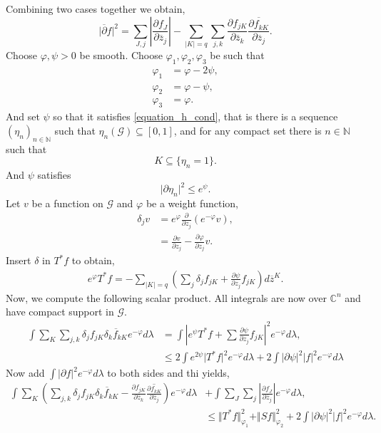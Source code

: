 \documentclass{article}
\newcommand{\norm}[1]{\Vert #1 \Vert}
\newcommand{\N}[0]{\mathbb{N}}
\newcommand{\C}[0]{\mathbb{C}}
\newcommand{\G}[0]{\mathcal{G}}
\newcommand{\pd}[2]{{\frac {\partial#1} {\partial#2}}}
\begin{document}
Combining two cases together we obtain,
\begin{equation*}
  \vert \overline{\partial}f\vert^2 = \sum_{J,j}\left\vert\pd{f_J}{\overline{z}_j}\right\vert-\sum_{\vert K\vert =q}\sum_{j,k}\pd{f_{jK}}{\overline{z}_k}\overline{\pd{f_{kK}}{\overline{z}_j}}.
\end{equation*}
Choose $\varphi,\psi>0$ be smooth. Choose $\varphi_1,\varphi_2,\varphi_3$ be such that 
  \begin{align*}
  \varphi_1 & = \varphi-2\psi,\\
  \varphi_2 & = \varphi-\psi,\tag{D}\\
  \varphi_3 & = \varphi.
\end{align*}
And set $\psi$ so that it satisfies \eqref{equation_h_cond}, that is there is a sequence $(\eta_n)_{n\in\N}$ such that $\eta_n(\G)\subseteq[0,1]$, and for any compact set there is $n\in \N$ such that 
\begin{equation*}
  K\subseteq \{\eta_n=1\}.
\end{equation*}
And $\psi$ satisfies 
\begin{equation*}
  \vert \partial\eta_n\vert^2\leq e^\psi\tag{H}.
\end{equation*}
Let $v$ be a function on $\G$ and $\varphi$ be a weight function,
\begin{align*}
  \delta_j v& = e^\varphi\pd{}{z_j}(e^{-\varphi}v),\\
  & = \pd{v}{z_j}-\pd{\varphi}{z_j}v.
\end{align*}
Insert $\delta$ in $T^*f$ to obtain,
\begin{align*}
  e^\varphi T^*f = -\sum_{\vert K\vert =q}\left(\sum_j \delta_jf_{jK}+\pd{\psi}{z_j}f_{jK}\right)d\overline{z}^K.
\end{align*}
Now, we compute the following scalar product. All integrals are now over $\C^n$ and have compact support in $\G$.
\begin{align*}
  \int \sum_{K}\sum_{j,k}\delta_jf_{jK}\overline{\delta_kf_{kK}}e^{-\varphi}d\lambda& = \int \left\vert e^\psi T^*f+\sum\pd{\psi}{z_j}f_{jK}\right\vert^2e^{-\varphi}d\lambda,\\
  & \leq 2\int e^{2\psi}\vert T^*f\vert^2 e^{-\varphi}d\lambda+2\int \vert\partial\psi\vert^2\vert f\vert^2e^{-\varphi}d\lambda
\end{align*}
Now add $\int\vert\partial f\vert^2e^{-\varphi}d\lambda$ to both sides and thi yields,
\begin{align*}\label{equation_star}
  \int\sum_K\left(\sum_{j,k}\delta_jf_{jK}\overline{\delta_kf_{kK}}-\pd{f_{jK}}{\overline{z}_k}\overline{\pd{f_{kK}}{\overline{z}_j}}\right)e^{-\varphi}d\lambda &+ \int \sum_J\sum_j\left\vert\pd{f_J}{\overline{z}_j}\right\vert e^{-\varphi}d\lambda,\tag{$\ast$}\\
  &\leq \norm{T^*f}_{\varphi_1}^2+\norm{Sf}_{\varphi_2}^2+2\int\vert\partial\psi\vert^2\vert f\vert^2e^{-\varphi}d\lambda.
\end{align*}
\end{document}
